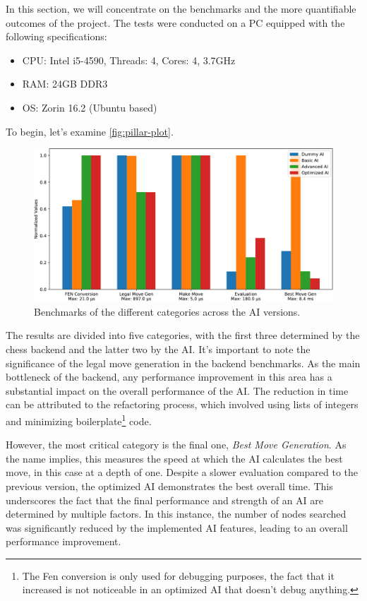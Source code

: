 In this section, we will concentrate on the benchmarks and the more quantifiable outcomes of the project. The tests were conducted on a PC equipped with the following specifications:

\begin{itemize}
  \item CPU: Intel i5-4590, Threads: 4, Cores: 4, 3.7GHz
  \item RAM: 24GB DDR3
  \item OS: Zorin 16.2 (Ubuntu based)
\end{itemize}

To begin, let's examine \autoref{fig:pillar-plot}.

\begin{figure}[hbtp]
	\centering
	\includegraphics[width=.9\linewidth, page=1]{reference/pics/plot.pdf}
	\caption{Benchmarks of the different categories across the AI versions.}
	\label{fig:pillar-plot}
\end{figure}

The results are divided into five categories, with the first three determined by the chess backend and the latter two by the AI. It's important to note the significance of the legal move generation in the backend benchmarks. As the main bottleneck of the backend, any performance improvement in this area has a substantial impact on the overall performance of the AI. The reduction in time can be attributed to the refactoring process, which involved using lists of integers and minimizing boilerplate\footnote{
The Fen conversion is only used for debugging
purposes, the fact that it increased is not noticeable
in an optimized AI that doesn't debug anything.} code.

However, the most critical category is the final one, \textit{Best Move Generation}. As the name implies, this measures the speed at which the AI calculates the best move, in this case at a depth of one. Despite a slower evaluation compared to the previous version, the optimized AI demonstrates the best overall time. This underscores the fact that the final performance and strength of an AI are determined by multiple factors. In this instance, the number of nodes searched was significantly reduced by the implemented AI features, leading to an overall performance improvement.

